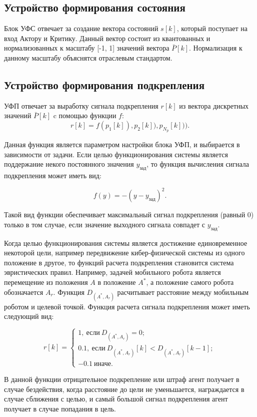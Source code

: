 \subsection{Устройство формирования состояния} \label{subsect2_2_2}
Блок УФС отвечает за создание вектора состояний $s[k]$, который поступает на вход Актору и Критику. Данный вектор состоит из квантованных и нормализованных к масштабу [-1, 1] значений вектора $\bar{P}[k]$. Нормализация к данному масштабу объяснятся отраслевым стандартом.

\subsection{Устройство формирования подкрепления} \label{subsect2_2_3}

УФП отвечает за выработку сигнала подкрепления $ r[k] $ из вектора дискретных значений $ \bar{P}[k] $ c помощью функции $ f $:
$$
r[k] = f(p_1[k]), p_2[k]), p_{N_p}[k])).
$$

Данная функция является параметром настройки блока УФП, и выбирается в зависимости от задачи. Если целью функционирования системы является поддержание некого постоянного значения $ y_{\text{зад}} $, то функция вычисления сигнала подкрепления может иметь вид:

$$
f(y) = -(y-y_{\text{зад}})^2.
$$

\noindent Такой вид функции обеспечивает максимальный сигнал подкрепления (равный 0) только в том случае, если значение выходного сигнала совпадет с  $ y_{\text{зад}} $.

Когда целью функционирования системы является достижение единовременное некоторой цели, например передвижение кибер-физической системы из одного положение в другое, то функций расчета подкрепления становится система эвристических правил. Например, задачей мобильного робота является перемещение из положения $ A $ в положение $ A^* $, а положение самого робота обозначается $ A_r $. Функция $ D_{(A^*, A_r)} $ расчитывает расстояние между мобильным роботом и целевой точкой. Функция расчета сигнала подкрепления может иметь следующий вид:

$$
r[k] = 
\begin{cases}
1, \: \text{если} \: D_{(A^*, A_r)}=0; \\
0.1, \: \text{если} \: D_{(A^*, A_r)}[k] < D_{(A^*, A_r)}[k-1]; \\
-0.1 \: \text{иначе}.
\end{cases}
$$

\noindent В данной функции отрицательное подкрепление или штраф агент получает в случае бездействия, когда расстояние до цели не уменьшается, награждается в случае сближения с целью, и самый большой сигнал подкрепления агент получает в случае попадания в цель.

